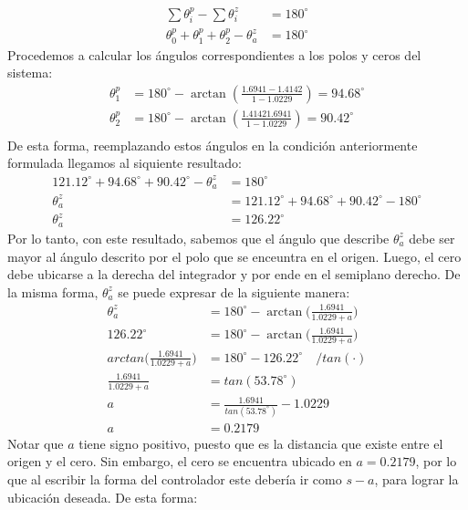 \documentclass[
  11pt,
  letterpaper,
   addpoints,
   answers
  ]{exam}
\begin{document}
\begin{questions}
\begin{solution}
\begin{enumerate}
    \begin{align}
        \sum \theta_i^p - \sum \theta_i^z&=180^{\circ} \nonumber \\
        \theta_0^p + \theta_1^p + \theta_2^p - \theta_a^z&=180^{\circ} \nonumber
    \end{align}
    Procedemos a calcular los ángulos correspondientes a los polos y ceros del sistema:
    \begin{align}
        \theta_1^p&=180^{\circ}-\arctan (\frac{1.6941-1.4142}{1-1.0229})=94.68^{\circ} \nonumber\\
        \theta_2^p&=180^{\circ}-\arctan (\frac{1.41421.6941}{1-1.0229})=90.42^{\circ} \nonumber\\
    \end{align}
    De esta forma, reemplazando estos ángulos en la condición anteriormente formulada llegamos al siquiente resultado:
    \begin{align}
        121.12^{\circ}+94.68^{\circ}+90.42^{\circ}-\theta_a^z&=180^{\circ} \nonumber \\
        \theta_a^z&=121.12^{\circ}+94.68^{\circ}+90.42^{\circ}-180^{\circ} \nonumber \\
        \theta_a^z&=126.22^{\circ} \nonumber
    \end{align}
    Por lo tanto, con este resultado, sabemos que el ángulo que describe $\theta_a^z$ debe ser mayor al ángulo descrito por el polo que se enceuntra en el origen. Luego, el cero debe ubicarse a la derecha del integrador y por ende en el semiplano derecho. De la misma forma, $\theta_a^z$ se puede expresar de la siguiente manera:
    \begin{align}
        \theta_a^z&=180^{\circ}-\arctan \Big(\frac{1.6941}{1.0229+a} \Big) \nonumber \\
        126.22^{\circ} &=180^{\circ}-\arctan \Big(\frac{1.6941}{1.0229+a} \Big) \nonumber \\
        arctan \Big(\frac{1.6941}{1.0229+a} \Big)&=180^{\circ}-126.22^{\circ} \quad /tan(\cdot)\nonumber\\
        \frac{1.6941}{1.0229+a}&=tan(53.78^{\circ}) \nonumber \\
        a&=\frac{1.6941}{tan(53.78^{\circ})}-1.0229 \nonumber \\
        a&=0.2179 \nonumber
    \end{align}
    Notar que $a$ tiene signo positivo, puesto que es la distancia que existe entre el origen y el cero. Sin embargo, el cero se encuentra ubicado en $a=0.2179$, por lo que al escribir la forma del controlador este debería ir como $s-a$, para lograr la ubicación deseada. De esta forma:

\end{enumerate}
\end{solution}
\end{questions}
\end{document}
